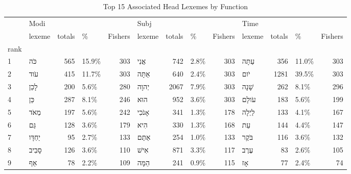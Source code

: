 \begin{table}[htbp!]
\centering
\caption{Top 15 Associated Head Lexemes by Function}
\label{table:mst_lexs}
\begin{adjustbox}{width=1\textwidth}
\begin{tabular}{llrlrlrlrlrlr}
\toprule
{} & \multicolumn{4}{l}{Modi} & \multicolumn{4}{l}{Subj} & \multicolumn{4}{l}{Time} \\
{} &                 lexeme & totals &      \% & Fishers &                  lexeme & totals &     \% & Fishers &                lexeme & totals &      \% & Fishers \\
rank &                        &        &        &         &                         &        &       &         &                       &        &        &         \\
\midrule
1    &      \texthebrew{כֹּה} &    565 &  15.9\% &     303 &      \texthebrew{אֲנִי} &    742 &  2.8\% &     303 &   \texthebrew{עַתָּה} &    356 &  11.0\% &     303 \\
2    &      \texthebrew{עֹוד} &    415 &  11.7\% &     303 &     \texthebrew{אַתָּה} &    640 &  2.4\% &     303 &     \texthebrew{יֹום} &   1281 &  39.5\% &     303 \\
3    &     \texthebrew{לָכֵן} &    200 &   5.6\% &     280 &     \texthebrew{יְהוָה} &   2067 &  7.9\% &     303 &   \texthebrew{שָׁנָה} &    262 &   8.1\% &     296 \\
4    &      \texthebrew{כֵּן} &    287 &   8.1\% &     246 &       \texthebrew{הוּא} &    952 &  3.6\% &     303 &   \texthebrew{עֹולָם} &    183 &   5.6\% &     199 \\
5    &     \texthebrew{מְאֹד} &    197 &   5.6\% &     242 &    \texthebrew{אָנֹכִי} &    341 &  1.3\% &     178 &  \texthebrew{לַיְלָה} &    133 &   4.1\% &     167 \\
6    &      \texthebrew{גַּם} &    128 &   3.6\% &     179 &       \texthebrew{הִיא} &    330 &  1.3\% &     168 &      \texthebrew{עֵת} &    144 &   4.4\% &     147 \\
7    &  \texthebrew{יַחְדָּו} &     95 &   2.7\% &     133 &     \texthebrew{אַתֶּם} &    254 &  1.0\% &     133 &   \texthebrew{בֹּקֶר} &    116 &   3.6\% &     132 \\
8    &    \texthebrew{סָבִיב} &    126 &   3.6\% &     110 &      \texthebrew{אִישׁ} &    871 &  3.3\% &     117 &    \texthebrew{עֶרֶב} &     83 &   2.6\% &     105 \\
9    &       \texthebrew{אַף} &     78 &   2.2\% &     109 &     \texthebrew{הֵמָּה} &    241 &  0.9\% &     115 &      \texthebrew{אָז} &     77 &   2.4\% &      74 \\

\end{tabular}
\end{adjustbox}
\end{table}
